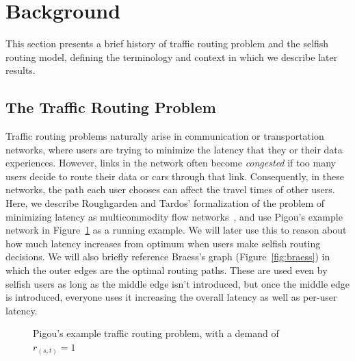 \section{Background}
\label{sec:background}
This section presents a brief history of traffic routing problem and the selfish routing model, defining the terminology and context in which 
we describe later results.

\subsection{The Traffic Routing Problem}
Traffic routing problems naturally arise in communication or transportation networks, where users are trying to minimize the latency that they or their data experiences.
However, links in the network often become \emph{congested} if too many users decide to route their data 
or cars through that link. Consequently, in these networks, the path each user chooses can affect the travel times of other
users. Here, we describe Roughgarden and Tardos' formalization of the problem of minimizing latency as multicommodity flow networks~\cite{tardos,roughgarden}, and use Pigou's example network in Figure~\ref{fig:Pigou} as a running example. We will later use this to reason about how much latency increases from optimum when users make selfish routing decisions. We will also briefly reference Braess's graph (Figure~\ref{fig:braess}) in which the outer edges are
the optimal routing paths. These are used even by selfish users as long as the middle edge isn't introduced, but once the middle edge is introduced, everyone uses it increasing the overall latency as well as per-user latency.

\begin{figure}[ht!]
\begin{center}
\end{center}
    \caption{Pigou's example traffic routing problem, with a demand of $r_{(s,t)} = 1$}
\label{fig:Pigou}
\end{figure}

